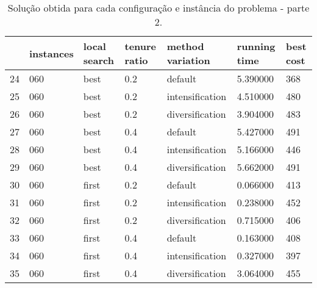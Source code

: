 \begin{landscape}
\begin{table}
\centering
\begin{tabular}{lllllll}
\toprule
{} & instances & local search & tenure ratio & method variation & running time & best cost \\
\midrule
24 &       060 &         best &          0.2 &          default &     5.390000 &       368 \\
25 &       060 &         best &          0.2 &  intensification &     4.510000 &       480 \\
26 &       060 &         best &          0.2 &  diversification &     3.904000 &       483 \\
27 &       060 &         best &          0.4 &          default &     5.427000 &       491 \\
28 &       060 &         best &          0.4 &  intensification &     5.166000 &       446 \\
29 &       060 &         best &          0.4 &  diversification &     5.662000 &       491 \\
30 &       060 &        first &          0.2 &          default &     0.066000 &       413 \\
31 &       060 &        first &          0.2 &  intensification &     0.238000 &       452 \\
32 &       060 &        first &          0.2 &  diversification &     0.715000 &       406 \\
33 &       060 &        first &          0.4 &          default &     0.163000 &       408 \\
34 &       060 &        first &          0.4 &  intensification &     0.327000 &       397 \\
35 &       060 &        first &          0.4 &  diversification &     3.064000 &       455 \\
\bottomrule
\end{tabular}
\caption{Solução obtida para cada configuração e instância do problema - parte 2.}
\label{table:all-data-2}
\end{table}


\end{landscape}
